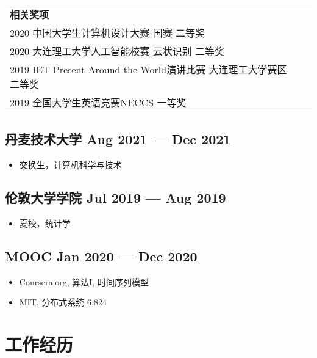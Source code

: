 \documentclass[a4,12pt]{article}
\newcommand{\subtext}[1]{
#1\par\vspace{-0.3cm}}
\newenvironment{zitemize}{
\begin{itemize}\itemsep0pt \parskip0pt \parsep1pt}
{\end{itemize}\vspace{-0.5cm}}
\begin{document}
\begin{tabular}{p{25em} p{21em}}
\textbf{\small 相关奖项} & \\
2020 中国大学生计算机设计大赛 国赛 二等奖 \\
2020  大连理工大学人工智能校赛-云状识别 二等奖 \\
2019 IET Present Around the World演讲比赛 大连理工大学赛区 二等奖\\
2019 全国大学生英语竞赛NECCS 一等奖 \\
\end{tabular}

\subsection*{丹麦技术大学 \hfill \textbf{Aug 2021 --- Dec 2021}}
\begin{zitemize}
    \item
        \subtext{交换生，计算机科学与技术}
        \vspace{0.15cm}
\end{zitemize}

\subsection*{伦敦大学学院 \hfill \textbf{Jul 2019 --- Aug 2019}}
\begin{zitemize}
    \item
        \subtext{夏校，统计学}
        \vspace{0.15cm}
\end{zitemize}

\subsection*{MOOC \hfill \textbf{Jan 2020 --- Dec 2020}}
\begin{zitemize}
    \item
        \subtext{Coursera.org, 算法I, 时间序列模型 }
        \vspace{0.15cm}
    \item
        \subtext{MIT, 分布式系统 6.824}
        \vspace{0.15cm}
\end{zitemize}
\vspace{0.2cm}





\section{\textbf{工作经历}}
\end{document}
